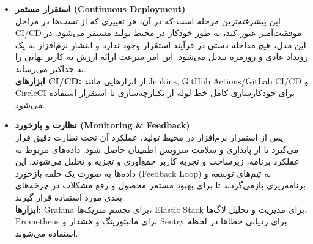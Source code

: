\begin{itemize}
    \item \textbf{استقرار مستمر (Continuous Deployment)} \\
    این پیشرفته‌ترین مرحله است که در آن، هر تغییری که از تست‌ها در مراحل CI/CD موفقیت‌آمیز عبور کند، به طور خودکار در محیط تولید مستقر می‌شود. در این مدل، هیچ مداخله دستی در فرآیند استقرار وجود ندارد و انتشار نرم‌افزار به یک رویداد عادی و روزمره تبدیل می‌شود. این امر سرعت ارائه ارزش به کاربر نهایی را به حداکثر می‌رساند. \\
    \textbf{ابزارهای CI/CD:} از ابزارهایی مانند Jenkins, GitHub Actions/GitLab CI/CD و CircleCI برای خودکارسازی کامل خط لوله از یکپارچه‌سازی تا استقرار استفاده می‌شود.

    \item \textbf{نظارت و بازخورد (Monitoring \& Feedback)} \\
    پس از استقرار نرم‌افزار در محیط تولید، عملکرد آن تحت نظارت دقیق قرار می‌گیرد تا از پایداری و سلامت سرویس اطمینان حاصل شود. داده‌های مربوط به عملکرد برنامه، زیرساخت و تجربه کاربر جمع‌آوری و تجزیه و تحلیل می‌شوند. این داده‌ها به صورت یک حلقه بازخورد (Feedback Loop) به تیم‌های توسعه و برنامه‌ریزی بازمی‌گردند تا برای بهبود مستمر محصول و رفع مشکلات در چرخه‌های بعدی مورد استفاده قرار گیرند. \\
    \textbf{ابزارها:} Grafana برای تجسم متریک‌ها، Elastic Stack برای مدیریت و تحلیل لاگ‌ها، Prometheus برای مانیتورینگ و هشدار و Sentry برای ردیابی خطاها در لحظه استفاده می‌شوند.
\end{itemize}
